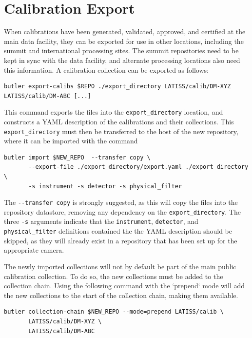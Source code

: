 \documentclass[DM,authoryear,toc]{lsstdoc}
\begin{document}
\section{Calibration Export}
\label{sec:calib_export}

When calibrations have been generated, validated, approved, and certified at the main data facility, they can be exported for use in other locations, including the summit and international processing sites.  The summit repositories need to be kept in sync with the data facility, and alternate processing locations also need this information.  A calibration collection can be exported as follows:

\begin{verbatim}
butler export-calibs $REPO ./export_directory LATISS/calib/DM-XYZ LATISS/calib/DM-ABC [...]
\end{verbatim}

This command exports the files into the \verb|export_directory| location, and constructs a YAML description of the calibrations and their collections.  This \verb|export_directory| must then be transferred to the host of the new repository, where it can be imported with the command

\begin{verbatim}
butler import $NEW_REPO  --transfer copy \
       --export-file ./export_directory/export.yaml ./export_directory \
       -s instrument -s detector -s physical_filter
\end{verbatim}

The \verb|--transfer copy| is strongly suggested, as this will copy the files into the repository datastore, removing any dependency on the \verb|export_directory|.  The three \verb|-s| arguments indicate that the \verb|instrument|, \verb|detector|, and \verb|physical_filter| definitions contained the the YAML description should be skipped, as they will already exist in a repository that has been set up for the appropriate camera.

The newly imported collections will not by default be part of the main public calibration collection.  To do so, the new collections must be added to the collection chain.  Using the following command with the `prepend` mode will add the new collections to the start of the collection chain, making them available.

\begin{verbatim}
butler collection-chain $NEW_REPO --mode=prepend LATISS/calib \
       LATISS/calib/DM-XYZ \
       LATISS/calib/DM-ABC
\end{verbatim}
\end{document}
